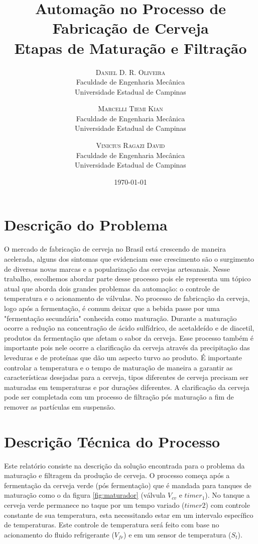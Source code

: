 \documentclass[twoside,twocolumn, 12pt]{paper}
\title{Automação no Processo de Fabricação de Cerveja\\ 
	\large Etapas de Maturação e Filtração} %
\author{%
	\textsc{Daniel D. R. Oliveira}\\[1ex]
	\normalsize Faculdade de Engenharia Mecânica\\
	\normalsize Universidade Estadual de Campinas\\
	\and
	\textsc{Marcelli Tiemi Kian}\\[1ex]
	\normalsize Faculdade de Engenharia Mecânica\\
	\normalsize Universidade Estadual de Campinas\\
	\and
	\textsc{Vinicius Ragazi David}\\[1ex]
	\normalsize Faculdade de Engenharia Mecânica\\
	\normalsize Universidade Estadual de Campinas\\
}
\date{\today} %
\begin{document}
	\maketitle
	
	\section{Descrição do Problema}
	O mercado de fabricação de cerveja no Brasil está crescendo de maneira acelerada, alguns dos sintomas que evidenciam esse crescimento são o surgimento de diversas novas marcas e a popularização das cervejas artesanais. Nesse trabalho, escolhemos abordar parte desse processo pois ele representa um tópico atual que aborda dois grandes problemas da automação: o controle de temperatura e o acionamento de válvulas.
	No processo de fabricação da cerveja, logo após a fermentação, é comum deixar que a bebida passe por uma "fermentação secundária" conhecida como maturação. Durante a maturação ocorre a redução na concentração de ácido sulfídrico, de acetaldeído e de diacetil, produtos da fermentação que afetam o sabor da cerveja. Esse processo também é importante pois nele ocorre a clarificação da cerveja através da precipitação das leveduras e de proteínas que dão um aspecto turvo ao produto. É importante controlar a temperatura e o tempo de maturação de maneira a garantir as características desejadas para a cerveja, tipos diferentes de cerveja precisam ser maturadas em temperaturas e por durações diferentes. A clarificação da cerveja pode ser completada com um processo de filtração pós maturação a fim de remover as partículas em suspensão.
	
	\section{Descrição Técnica do Processo}
	
	Este relatório consiste na descrição da solução encontrada para o problema da maturação e filtragem da produção de cerveja. O processo começa após a fermentação da cerveja verde (pós fermentação) que é mandada para tanques de maturação como o da figura \ref{fig:maturador} (válvula $V_{cv}$ e $timer_1$). No tanque a cerveja verde permanece no taque por um tempo variado ($timer2$) com controle constante de sua temperatura, esta necessitando estar em um intervalo específico de temperaturas. Este controle de temperatura será feito com base no acionamento do fluido refrigerante ($V_{fr}$) e em um sensor de temperatura ($S_t$).
	
\end{document}
